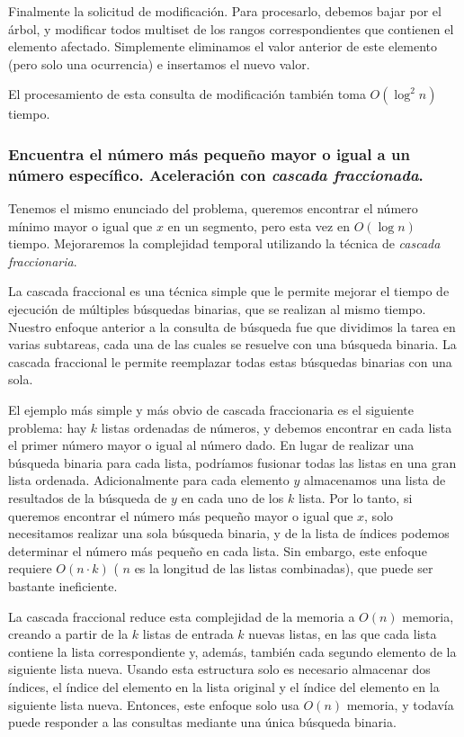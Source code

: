 Finalmente la solicitud de modificación. Para procesarlo, debemos bajar por el árbol, y modificar todos $\text{multiset}$ de los rangos correspondientes que contienen el elemento afectado. Simplemente eliminamos el valor anterior de este elemento (pero solo una ocurrencia) e insertamos el nuevo valor.

El procesamiento de esta consulta de modificación también toma $O(\log^2n)$ tiempo.

\subsubsection{Encuentra el número más pequeño mayor o igual a un número específico. Aceleración con \emph{cascada fraccionada}.}

Tenemos el mismo enunciado del problema, queremos encontrar el número mínimo mayor o igual que $x$ en un segmento, pero esta vez en $O(\log n)$ tiempo. Mejoraremos la complejidad temporal utilizando la técnica de \emph{cascada fraccionaria}.

La cascada fraccional es una técnica simple que le permite mejorar el tiempo de ejecución de múltiples búsquedas binarias, que se realizan al mismo tiempo. Nuestro enfoque anterior a la consulta de búsqueda fue que dividimos la tarea en varias subtareas, cada una de las cuales se resuelve con una búsqueda binaria. La cascada fraccional le permite reemplazar todas estas búsquedas binarias con una sola.

El ejemplo más simple y más obvio de cascada fraccionaria es el siguiente problema: hay $k$ listas 
ordenadas de números, y debemos encontrar en cada lista el primer número mayor o igual al número dado. 
En lugar de realizar una búsqueda binaria para cada lista, podríamos fusionar todas las listas en una 
gran lista ordenada. Adicionalmente para cada elemento $y$ almacenamos una lista de resultados de la 
búsqueda de $y$ en cada uno de los $k$ lista. Por lo tanto, si queremos encontrar el número más pequeño 
mayor o igual que $x$, solo necesitamos realizar una sola búsqueda binaria, y de la lista de índices podemos determinar el número más pequeño en cada lista. Sin embargo, este enfoque requiere 
$O(n\cdot k)$ ( $n$ es la longitud de las listas combinadas), que puede ser bastante ineficiente.

La cascada fraccional reduce esta complejidad de la memoria a $O(n)$ memoria, creando a partir de la $k$ listas de entrada $k$ nuevas listas, en las que cada lista contiene la lista correspondiente y, además, también cada segundo elemento de la siguiente lista nueva. Usando esta estructura solo es necesario almacenar dos índices, el índice del elemento en la lista original y el índice del elemento en la siguiente lista nueva. Entonces, este enfoque solo usa $O(n)$ memoria, y todavía puede responder a las consultas mediante una única búsqueda binaria.

